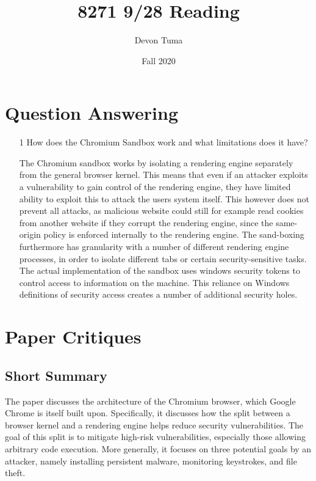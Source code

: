 \documentclass[11pt]{article}
\title{8271 9/28 Reading}
\author{Devon Tuma}
\date{Fall 2020}
\begin{document}
\maketitle

\section*{Question Answering}

\begin{itemize}
\item [1] How does the Chromium Sandbox work and what limitations does it have?

  The Chromium sandbox works by isolating a rendering engine separately from the general browser kernel.
  This means that even if an attacker exploits a vulnerability to gain control of the rendering engine, they have limited ability to exploit this to attack the users system itself.
  This however does not prevent all attacks, as malicious website could still for example read cookies from another website if they corrupt the rendering engine, since the same-origin policy is enforced internally to the rendering engine.
  The sand-boxing furthermore has granularity with a number of different rendering engine processes, in order to isolate different tabs or certain security-sensitive tasks.
  The actual implementation of the sandbox uses windows security tokens to control access to information on the machine.
  This reliance on Windows definitions of security access creates a number of additional security holes.
\end{itemize}

\section*{Paper Critiques}

\subsection*{Short Summary}

The paper discusses the architecture of the Chromium browser, which Google Chrome is itself built upon.
Specifically, it discusses how the split between a browser kernel and a rendering engine helps reduce security vulnerabilities.
The goal of this split is to mitigate high-risk vulnerabilities, especially those allowing arbitrary code execution.
More generally, it focuses on three potential goals by an attacker, namely installing persistent malware, monitoring keystrokes, and file theft.
\end{document}
